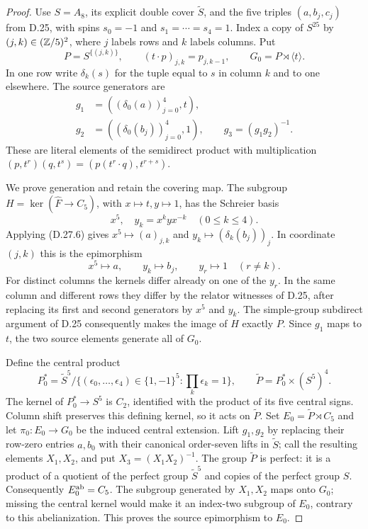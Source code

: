 \begin{proof}
Use $S=A_8$, its explicit double cover $\widetilde S$, and
the five triples $(a,b_j,c_j)$ from D.25, with spins
$s_0=-1$ and $s_1=\cdots=s_4=1$.  Index a copy of $S^{25}$
by $(j,k)\in(\mathbb Z/5)^2$, where $j$ labels rows and $k$
labels columns.  Put
\[
 P=S^{\{(j,k)\}},\qquad
 (t\cdot p)_{j,k}=p_{j,k-1},\qquad
 G_0=P\rtimes\langle t\rangle.
 \tag{D.27.5}
\]
In one row write $\delta_k(s)$ for the tuple equal to $s$
in column $k$ and to one elsewhere.  The source generators are
\[
 \begin{split}
 g_1&=((\delta_0(a))_{j=0}^4,t),\\
 g_2&=((\delta_0(b_j))_{j=0}^4,1),\qquad
 g_3=(g_1g_2)^{-1}.
 \end{split}
 \tag{D.27.6}
\]
These are literal elements of the semidirect product with
multiplication $(p,t^r)(q,t^s)=(p(t^r\cdot q),t^{r+s})$.

We prove generation and retain the covering map.  The subgroup
$H=\ker(\widehat F\to C_5)$, with $x\mapsto t,y\mapsto1$,
has the Schreier basis
\[
 x^5,\quad y_k=x^kyx^{-k}\quad(0\leq k\leq4).
 \tag{D.27.7}
\]
Applying \textup{(D.27.6)} gives $x^5\mapsto(a)_{j,k}$ and
$y_k\mapsto(\delta_k(b_j))_j$.  In coordinate $(j,k)$ this
is the epimorphism
\[
 x^5\longmapsto a,\qquad
 y_k\longmapsto b_j,\qquad
 y_r\longmapsto1\quad(r\ne k).
 \tag{D.27.8}
\]
For distinct columns the kernels differ already on one of the
$y_r$.  In the same column and different rows they differ by
the relator witnesses of D.25, after replacing its first and
second generators by $x^5$ and $y_k$.  The simple-group
subdirect argument of D.25 consequently makes the image of
$H$ exactly $P$.  Since $g_1$ maps to $t$, the two source
elements generate all of $G_0$.

Define the central product
\[
 P_0^*=\widetilde S^5/
 \{(\epsilon_0,\ldots,\epsilon_4)\in\{1,-1\}^5:
                        \prod_k\epsilon_k=1\},
 \qquad
 \widetilde P=P_0^*\times(S^5)^4.
 \tag{D.27.9}
\]
The kernel of $P_0^*\to S^5$ is $C_2$, identified with the
product of its five central signs.  Column shift preserves
this defining kernel, so it acts on $\widetilde P$.
Set $E_0=\widetilde P\rtimes C_5$ and let
$\pi_0:E_0\to G_0$ be the induced central extension.
Lift $g_1,g_2$ by replacing their row-zero entries $a,b_0$
with their canonical order-seven lifts in $\widetilde S$;
call the resulting elements $X_1,X_2$, and put
$X_3=(X_1X_2)^{-1}$.
The group $\widetilde P$ is perfect: it is a product of a
quotient of the perfect group $\widetilde S^5$ and copies
of the perfect group $S$.  Consequently $E_0^{\rm ab}=C_5$.
The subgroup generated by $X_1,X_2$ maps onto $G_0$; missing
the central kernel would make it an index-two subgroup of
$E_0$, contrary to this abelianization.  This proves the
source epimorphism to $E_0$.


\end{proof}
